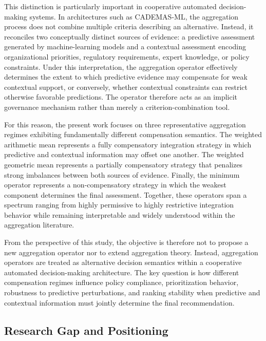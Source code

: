 \documentclass[mathematics,article,submit,moreauthors]{Definitions/mdpi}
\begin{document}
This distinction is particularly important in cooperative automated
decision-making systems. In architectures such as CADEMAS-ML, the
aggregation process does not combine multiple criteria describing an
alternative. Instead, it reconciles two conceptually distinct sources of
evidence: a predictive assessment generated by machine-learning models
and a contextual assessment encoding organizational priorities,
regulatory requirements, expert knowledge, or policy constraints. Under
this interpretation, the aggregation operator effectively determines the
extent to which predictive evidence may compensate for weak contextual
support, or conversely, whether contextual constraints can restrict
otherwise favorable predictions. The operator therefore acts as an
implicit governance mechanism rather than merely a criterion-combination
tool.

For this reason, the present work focuses on three representative
aggregation regimes exhibiting fundamentally different compensation
semantics. The weighted arithmetic mean represents a fully compensatory
integration strategy in which predictive and contextual information may
offset one another. The weighted geometric mean represents a partially
compensatory strategy that penalizes strong imbalances between both
sources of evidence. Finally, the minimum operator represents a
non-compensatory strategy in which the weakest component determines the
final assessment. Together, these operators span a spectrum ranging from
highly permissive to highly restrictive integration behavior while
remaining interpretable and widely understood within the aggregation
literature.

From the perspective of this study, the objective is therefore not to
propose a new aggregation operator nor to extend aggregation theory.
Instead, aggregation operators are treated as alternative decision
semantics within a cooperative automated decision-making architecture.
The key question is how different compensation regimes influence policy
compliance, prioritization behavior, robustness to predictive
perturbations, and ranking stability when predictive and contextual
information must jointly determine the final recommendation.

\subsection{Research Gap and Positioning}
\label{subsec:research-gap}
\end{document}
